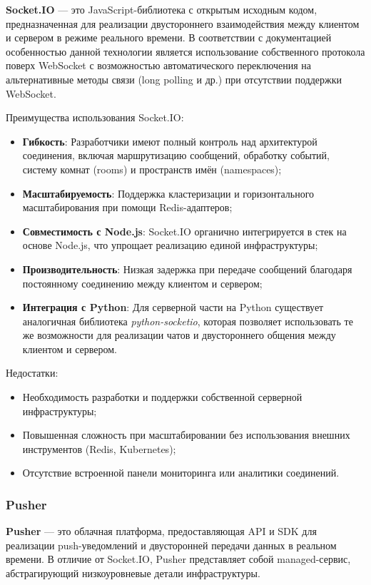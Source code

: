 \textbf{Socket.IO} — это JavaScript-библиотека с открытым исходным кодом, предназначенная для реализации двустороннего взаимодействия между клиентом и сервером в режиме реального времени. В соответствии с документацией~\cite{socketio_docs} особенностью данной технологии является использование собственного протокола поверх WebSocket с возможностью автоматического переключения на альтернативные методы связи (long polling и др.) при отсутствии поддержки WebSocket.

Преимущества использования Socket.IO:
\begin{itemize}
  \item \textbf{Гибкость}: Разработчики имеют полный контроль над архитектурой соединения, включая маршрутизацию сообщений, обработку событий, систему комнат (rooms) и пространств имён (namespaces);
  \item \textbf{Масштабируемость}: Поддержка кластеризации и горизонтального масштабирования при помощи Redis-адаптеров;
  \item \textbf{Совместимость с Node.js}: Socket.IO органично интегрируется в стек на основе Node.js, что упрощает реализацию единой инфраструктуры;
  \item \textbf{Производительность}: Низкая задержка при передаче сообщений благодаря постоянному соединению между клиентом и сервером;
  \item \textbf{Интеграция с Python}: Для серверной части на Python существует аналогичная библиотека \textit{python-socketio}, которая позволяет использовать те же возможности для реализации чатов и двустороннего общения между клиентом и сервером.
\end{itemize}

Недостатки:
\begin{itemize}
  \item Необходимость разработки и поддержки собственной серверной инфраструктуры;
  \item Повышенная сложность при масштабировании без использования внешних инструментов (Redis, Kubernetes);
  \item Отсутствие встроенной панели мониторинга или аналитики соединений.
\end{itemize}

\subsubsection*{Pusher}

\textbf{Pusher} — это облачная платформа, предоставляющая API и SDK для реализации push-уведомлений и двусторонней передачи данных в реальном времени\cite{pusher_docs}. В отличие от Socket.IO, Pusher представляет собой managed-сервис, абстрагирующий низкоуровневые детали инфраструктуры.

